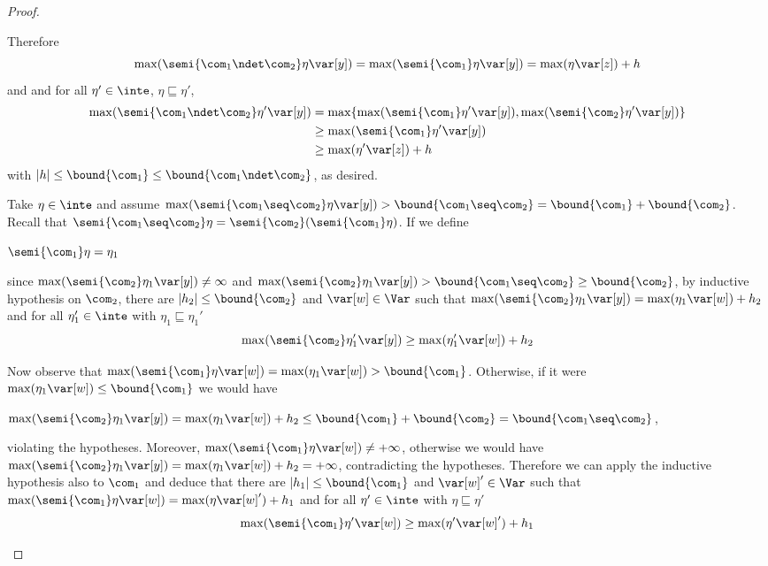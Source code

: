 \begin{proof}
\begin{inductive}
    Therefore 
    \[
      \max(\semi{\com_1 \ndet \com_2}\eta \var[y])
      = \max(\semi{\com_1}\eta \var[y]) = \max(\eta \var[z]) + h
    \]
    and and for
    all \(\eta' \in \inte\), \(\eta \sqsubseteq \eta'\),
    \begin{align*}
      \max(\semi{\com_1 \ndet \com_2}\eta' \var[y])
      &= \max\{ \max(\semi{\com_1}\eta' \var[y]),  \max(\semi{\com_2}\eta' \var[y])\}\\
      & \geq \max(\semi{\com_1}\eta' \var[y])\\
      & \geq \max(\eta' \var[z]) + h
    \end{align*}
    with \(|h| \leq \bound{\com_1} \leq \bound{\com_1 \ndet \com_2}\), as desired.

    
    Take \(\eta \in \inte\) and assume
    \(\max(\semi{\com_1 \seq \com_2}\eta\var[y]) > \bound{\com_1 \seq
      \com_2} = \bound{\com_1} + \bound{\com_2}\).  Recall that
    \(\semi{\com_1 \seq \com_2} \eta =
    \semi{\com_2}(\semi{\com_1}\eta)\).
    If we define
    \begin{center}
      \(\semi{\com_1} \eta = \eta_1\)
    \end{center}
    since \(\max(\semi{\com_2}\eta_1 \var[y]) \neq \infty\) and
    \(\max(\semi{\com_2} \eta_1 \var[y]) > \bound{\com_1 \seq \com_2}
    \geq \bound{\com_2}\), by inductive hypothesis on \(\com_2\), there
    are \(|h_2| \leq \bound{\com_2}\) and \(\var[w] \in \Var\) such that
    \(\max(\semi{\com_2} \eta_1 \var[y]) = \max(\eta_1 \var[w]) + h_2\)
    and for all \(\eta_1' \in \inte\) with
    \(\eta_1 \sqsubseteq \eta_1'\)
    \begin{equation}
      \label{eq:seq2}
      \max(\semi{\com_2} \eta_1' \var[y]) \geq \max(\eta_1' \var[w]) + h_2
    \end{equation}
    
    Now observe that
    \(\max(\semi{\com_1}\eta \var[w]) = \max(\eta_1 \var[w]) >
    \bound{\com_1}\). Otherwise, if it were \(\max(\eta_1 \var[w]) \leq
    \bound{\com_1}\) we would have
    \begin{center}
      \(\max(\semi{\com_2}\eta_1 \var[y]) = \max(\eta_1 \var[w]) + h_2 \leq
      \bound{\com_1} + \bound{\com_2} = \bound{\com_1 \seq \com_2}\),
    \end{center}
    violating the hypotheses. Moreover,
    \(\max(\semi{\com_1}\eta \var[w]) \neq +\infty\), otherwise we
    would have
    \({\max(\semi{\com_2} \eta_1 \var[y])} = {\max(\eta_1 \var[w]) +
      h_2} = + \infty\), contradicting the hypotheses.  Therefore we
    can apply the inductive hypothesis also to \(\com_1\) and deduce
    that there are \(|h_1| \leq \bound{\com_1}\) and
    \(\var[w]' \in \Var\) such that
    \(\max(\semi{\com_1} \eta \var[w]) = \max(\eta \var[w]') + h_1\)
    and for all \(\eta' \in \inte\) with \(\eta \sqsubseteq \eta'\)
    \begin{equation}
      \label{eq:seq1}
      \max(\semi{\com_1} \eta' \var[w]) \geq \max(\eta' \var[w]') + h_1
    \end{equation}


\end{inductive}
\end{proof}
